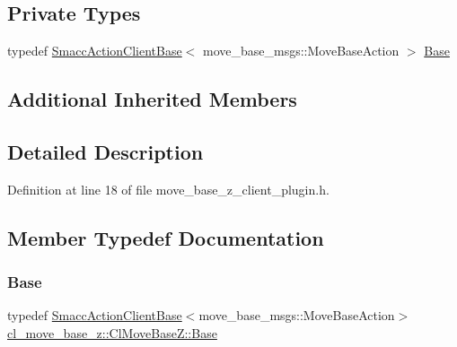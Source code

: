 \subsection*{Private Types}
\begin{DoxyCompactItemize}
\item 
typedef \hyperlink{classsmacc_1_1client__bases_1_1SmaccActionClientBase_af38f27dd26f8a87fea6b3eaa4a84e604}{Smacc\+Action\+Client\+Base}$<$ move\+\_\+base\+\_\+msgs\+::\+Move\+Base\+Action $>$ \hyperlink{classcl__move__base__z_1_1ClMoveBaseZ_a5e67ee7220b881368468613fa060b664}{Base}
\end{DoxyCompactItemize}
\subsection*{Additional Inherited Members}


\subsection{Detailed Description}


Definition at line 18 of file move\+\_\+base\+\_\+z\+\_\+client\+\_\+plugin.\+h.



\subsection{Member Typedef Documentation}
\mbox{\label{classcl__move__base__z_1_1ClMoveBaseZ_a5e67ee7220b881368468613fa060b664}} 
\subsubsection{\texorpdfstring{Base}{Base}}
{\footnotesize\ttfamily typedef \hyperlink{classsmacc_1_1client__bases_1_1SmaccActionClientBase_af38f27dd26f8a87fea6b3eaa4a84e604}{Smacc\+Action\+Client\+Base}$<$move\+\_\+base\+\_\+msgs\+::\+Move\+Base\+Action$>$ \hyperlink{classcl__move__base__z_1_1ClMoveBaseZ_a5e67ee7220b881368468613fa060b664}{cl\+\_\+move\+\_\+base\+\_\+z\+::\+Cl\+Move\+Base\+Z\+::\+Base}\hspace{0.3cm}{\ttfamily [private]}}



